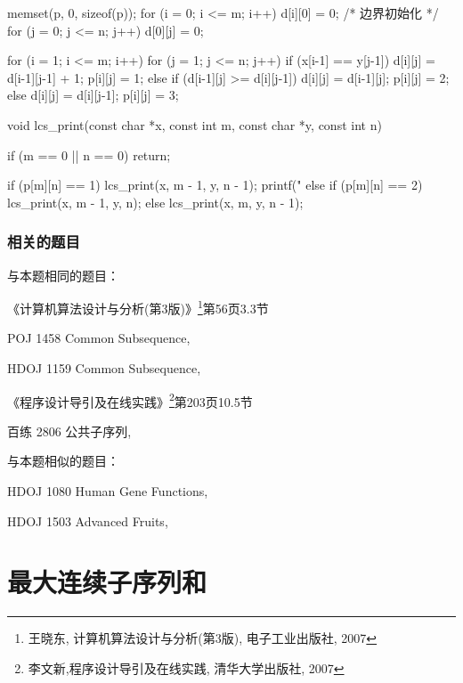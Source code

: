 \begin{Codex}[label=lcs.c]
{    memset(p, 0, sizeof(p));
    for (i = 0; i <= m; i++) d[i][0] = 0;  /* 边界初始化 */
    for (j = 0; j <= n; j++) d[0][j] = 0;

    for (i = 1; i <= m; i++) {
        for (j = 1; j <= n; j++) {
            if (x[i-1] == y[j-1]) {
                d[i][j] = d[i-1][j-1] + 1;
                p[i][j] = 1;
            } else {
                if (d[i-1][j] >= d[i][j-1]) {
                    d[i][j] = d[i-1][j];
                    p[i][j] = 2;
                } else {
                    d[i][j] = d[i][j-1];
                    p[i][j] = 3;
                }
            }
        }
    }
}

void lcs_print(const char *x, const int m, const char *y, const int n) {
    if (m == 0 || n == 0) return;

    if (p[m][n] == 1) {
        lcs_print(x, m - 1, y, n - 1);
        printf("%
    } else if (p[m][n] == 2) {
        lcs_print(x, m - 1, y, n);
    } else {
        lcs_print(x, m, y, n - 1);
    }
}
\end{Codex}

\subsubsection{相关的题目}
与本题相同的题目：
\begindot
\item 《计算机算法设计与分析(第3版)》\footnote{王晓东, 计算机算法设计与分析(第3版), 电子工业出版社, 2007}第56页3.3节
\item POJ 1458 Common Subsequence, 
\item HDOJ 1159 Common Subsequence, 
\item 《程序设计导引及在线实践》\footnote{李文新,程序设计导引及在线实践, 清华大学出版社, 2007}第203页10.5节
\item 百练 2806 公共子序列, 
\myenddot

与本题相似的题目：
\begindot
\item HDOJ 1080 Human Gene Functions, 
\item HDOJ 1503 Advanced Fruits, 
\myenddot


\section{最大连续子序列和} %
